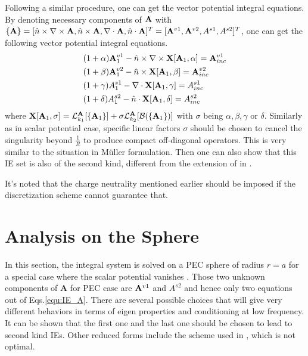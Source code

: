 \documentclass[conference]{IEEEtran}
\begin{document}
Following a similar procedure, one can get the vector potential integral equations. By denoting necessary components of  ${\bf A}$ with 
$\{ {\bf A}\} = [\hat{n}\times \nabla \times {\bf A} , \hat{n}\times  {\bf A}, \nabla \cdot {\bf A}, \hat{n} \cdot {\bf A}  ]^T 
=  [{\bf A}^{v1} , {\bf A}^{v2}, A^{s1}, A^{s2}]^T $, one can get the following vector potential integral equations.
\begin{subequations}
\label{equ:IE_A}
\begin{align}
& (1+\alpha) {\bf A}_1^{v1}
-  \hat{n}\times \nabla \times  {\bf X}[{\bf A}_1, \alpha]  =  {\bf A}_{inc}^{v1}\\
&(1+\beta) {\bf A}_1^{v2}
-  \hat{n}\times  {\bf X}[{\bf A}_1, \beta]   =  {\bf A}_{inc}^{v2}\\
&(1+\gamma) A_1^{s1}
-  \nabla \cdot  {\bf X}[{\bf A}_1, \gamma]   =  A_{inc}^{s1}\\
&(1+\delta) A_1^{s2}
-  \hat{n}\cdot  {\bf X}[{\bf A}_1, \delta]   =  A_{inc}^{s2}
\end{align}
\end{subequations}
where ${\bf X}[{\bf A}_1, \sigma] = \mathcal{L}^{{\bf A}}_{k_1}[\{ {\bf A}_{1} \}] 
+ \sigma \mathcal{L}^{{\bf A}}_{k_2}[\mathcal{B}(\{  {\bf A}_1 \})] $ with $\sigma$ being $\alpha, \beta, \gamma$ or $\delta$. Similarly as in scalar potential case, specific linear factors $\sigma$ should be chosen to cancel the singularity beyond $\frac{1}{R}$ to produce compact off-diagonal operators. This is very similar to the situation in M\"{u}ller formulation. Then one can also show that this IE set is also of the second kind, different from the extension of \cite{Liu2015} in \cite{Liu2016}.

It's noted that  the charge neutrality mentioned earlier should be imposed if the discretization scheme cannot guarantee that.

\section{Analysis on the Sphere}
In this section, the integral system is solved on a PEC sphere of radius $r=a$ for a special case where the scalar potential vanishes \cite{Chew2014,Liu2015}. 
Those two unknown components of $\mathbf{A}$ for PEC case are ${\bf A}^{v1}$ and $A^{s2}$ and hence only two equations out of Eqs.\ref{equ:IE_A}. There are several possible choices that will give very different behaviors in terms of eigen properties and conditioning at low frequency. It can be shown that the first one and the last one should be chosen to lead to second kind IEs. Other reduced forms include the scheme used in \cite{Liu2015}, which is not optimal. 
\end{document}
